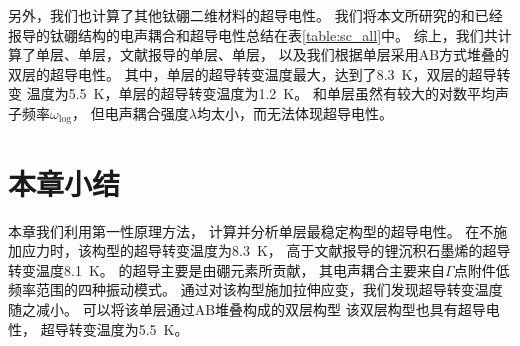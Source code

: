 另外，我们也计算了其他钛硼二维材料的超导电性。
我们将本文所研究的和已经报导的钛硼结构的电声耦合和超导电性总结在表\ref{table:sc_all}中。
综上，我们共计算了单层、单层，文献报导的单层、单层，
以及我们根据单层采用AB方式堆叠的双层的超导电性。
其中，单层的超导转变温度最大，达到了\SI{8.3}{\kelvin}，双层的超导转变
温度为\SI{5.5}{\kelvin}，单层的超导转变温度为\SI{1.2}{\kelvin}。
和单层虽然有较大的对数平均声子频率$\omega_{\mathrm{log}}$，
但电声耦合强度$\lambda$均太小，而无法体现超导电性。

\section{本章小结}

本章我们利用第一性原理方法，
计算并分析单层最稳定构型的超导电性。
在不施加应力时，该构型的超导转变温度为\SI{8.3}{\kelvin}，
高于文献报导的锂沉积石墨烯的超导转变温度\SI{8.1}{\kelvin}。
的超导主要是由硼元素所贡献，
其电声耦合主要来自$\Gamma$点附件低频率范围的四种振动模式。
通过对该构型施加拉伸应变，我们发现超导转变温度随之减小。
可以将该单层通过AB堆叠构成的双层构型
该双层构型也具有超导电性，
超导转变温度为\SI{5.5}{\kelvin}。

